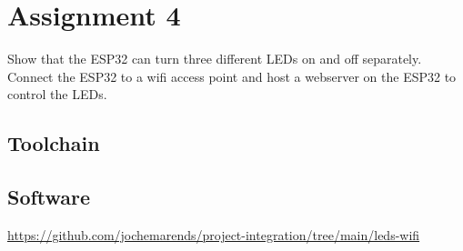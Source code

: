 \section{Assignment 4}
Show that the ESP32 can turn three different LEDs on and off separately. Connect the ESP32 to a \gls{wifi} access point and host a webserver on the ESP32 to control the LEDs.

\subsection{Toolchain}

\subsection{Software}
\url{https://github.com/jochemarends/project-integration/tree/main/leds-wifi}

